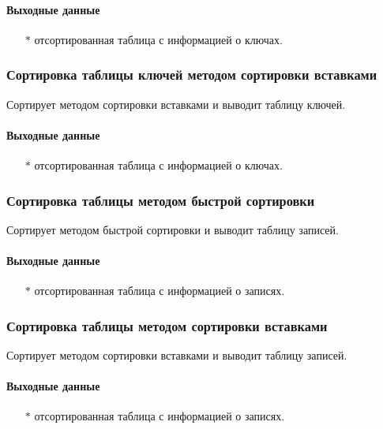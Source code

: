 \documentclass[a4paper,12pt]{extarticle}
\begin{document}
\paragraph{Выходные данные}
\begin{itemize}
    \item[$*$] отсортированная таблица с информацией о ключах.
\end{itemize}

\subsubsection{Сортировка таблицы ключей методом сортировки вставками}
Сортирует методом сортировки вставками и выводит таблицу ключей.

\paragraph{Выходные данные}
\begin{itemize}
    \item[$*$] отсортированная таблица с информацией о ключах.
\end{itemize}

\subsubsection{Сортировка таблицы методом быстрой сортировки}
Сортирует методом быстрой сортировки и выводит таблицу записей.

\paragraph{Выходные данные}
\begin{itemize}
    \item[$*$] отсортированная таблица с информацией о записях.
\end{itemize}

\subsubsection{Сортировка таблицы методом сортировки вставками}
Сортирует методом сортировки вставками и выводит таблицу записей.

\paragraph{Выходные данные}
\begin{itemize}
    \item[$*$] отсортированная таблица с информацией о записях.
\end{itemize}
\end{document}
